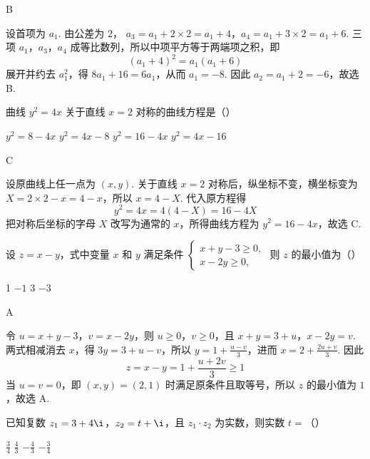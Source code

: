 \begin{answer}
B
\end{answer}

\begin{solution}
设首项为 \(a_1\). 由公差为 \(2\)，
\(a_3=a_1+2\times2=a_1+4\)，\(a_4=a_1+3\times2=a_1+6\).
三项 \(a_1\)，\(a_3\)，\(a_4\) 成等比数列，所以中项平方等于两端项之积，即
\[
(a_1+4)^2=a_1(a_1+6)
\]
展开并约去 \(a_1^2\)，得 \(8a_1+16=6a_1\)，从而 \(a_1=-8\). 因此
\(a_2=a_1+2=-6\)，故选 B.
\end{solution}

\begin{problem}
曲线 \(y^2=4x\) 关于直线 \(x=2\) 对称的曲线方程是（\quad）

\choices
    {\(y^2=8-4x\)}
    {\(y^2=4x-8\)}
    {\(y^2=16-4x\)}
    {\(y^2=4x-16\)}
\end{problem}

\begin{answer}
C
\end{answer}

\begin{solution}
设原曲线上任一点为 \((x,y)\). 关于直线 \(x=2\) 对称后，纵坐标不变，横坐标变为
\(X=2\times2-x=4-x\)，所以 \(x=4-X\). 代入原方程得
\[
y^2=4x=4(4-X)=16-4X
\]
把对称后坐标的字母 \(X\) 改写为通常的 \(x\)，所得曲线方程为 \(y^2=16-4x\)，故选 C.
\end{solution}

\begin{problem}
设 \(z=x-y\)，式中变量 \(x\) 和 \(y\) 满足条件 \(\begin{cases}
x+y-3\geqslant0,\\
x-2y\geqslant0,
\end{cases}\) 则 \(z\) 的最小值为（\quad）

\choices
    {1}
    {\(-1\)}
    {3}
    {\(-3\)}
\end{problem}

\begin{answer}
A
\end{answer}

\begin{solution}
令 \(u=x+y-3\)，\(v=x-2y\)，则 \(u\geqslant0\)，\(v\geqslant0\)，且
\(x+y=3+u\)，\(x-2y=v\).
两式相减消去 \(x\)，得 \(3y=3+u-v\)，所以
\(y=1+\frac{u-v}{3}\)，进而 \(x=2+\frac{2u+v}{3}\). 因此
\[
z=x-y=1+\frac{u+2v}{3}\geqslant1
\]
当 \(u=v=0\)，即 \((x,y)=(2,1)\) 时满足原条件且取等号，所以 \(z\) 的最小值为 \(1\)，故选 A.
\end{solution}

\begin{problem}
已知复数 \(z_1=3+4\i\)，\(z_2=t+\i\)，且 \(z_1\cdot z_2\) 为实数，则实数 \(t=\)（\quad）

\choices
    {\(\frac{3}{4}\)}
    {\(\frac{4}{3}\)}
    {\(-\frac{4}{3}\)}
    {\(-\frac{3}{4}\)}
\end{problem}

